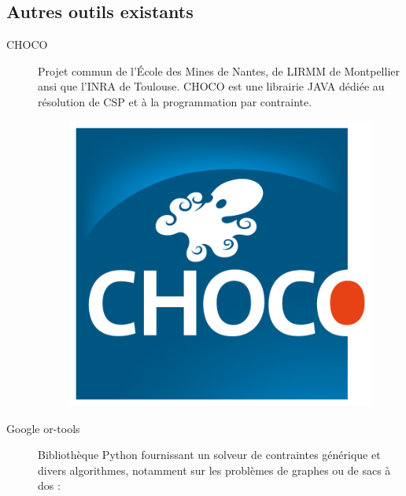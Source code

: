 \subsection{Autres outils existants}
\begin{description}
\item [CHOCO]  Projet commun  de l'École des Mines de Nantes, de \textsc{LIRMM} de Montpellier ansi que l'INRA de Toulouse. \textsc{CHOCO} est une librairie  \textsc{JAVA}  dédiée au résolution de \textsc{CSP} et à la programmation par contrainte. \cite{choco}
 \begin{figure}[h] %
  \center
\includegraphics[scale=0.50]{img/choco}
\end{figure} %
\item [Google or-tools]
 Bibliothèque Python fournissant un solveur de contraintes générique et divers algorithmes, notamment sur les problèmes de graphes ou de sacs à dos : \cite{ortools}


\end{description}
